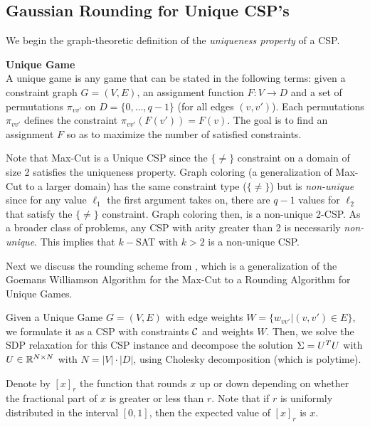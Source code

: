  \subsection{Gaussian Rounding for Unique CSP's}

We begin the graph-theoretic definition of the \textit{uniqueness property} of a CSP.
\begin{definition}{\bf Unique Game}\\
A unique game is any game that can be stated in the following terms: given a constraint graph $G = (V, E)$, an assignment function $F: V \rightarrow D$ and a set of permutations $\pi_{vv'}$ on $D = \{0, \ldots, q-1 \}$ (for all edges $(v, v')$). Each permutations $\pi_{vv'}$ defines the constraint $\pi_{vv'}(F(v'))=F(v)$. The goal is to find an assignment $F$ so as to maximize the number of satisfied constraints.
\end{definition}

Note that Max-Cut is a Unique CSP since the $\{\neq\}$ constraint on a domain of size 2 satisfies the uniqueness property. Graph coloring (a generalization of Max-Cut to a larger domain) has the same constraint type ($\{\neq\}$) but is \textit{non-unique} since for any value $\ell_1$ the first argument takes on, there are $q-1$ values for $\ell_2$ that satisfy the $\{\neq\}$ constraint. Graph coloring then, is a non-unique 2-CSP. As a broader class of problems, any CSP with arity greater than 2 is necessarily \textit{non-unique}. This implies that $k-$SAT with $k > 2$ is a non-unique CSP.

Next we discuss the rounding scheme from \cite{cmm06}, which is a generalization of the Goemans Williamson Algorithm for the Max-Cut to a Rounding Algorithm for Unique Games. 

Given a Unique Game $G = (V,E)$ with edge weights $W = \{w_{vv'} | (v, v') \in E \}$, we formulate it as a CSP with constraints $\mathcal{C}$ and weights $W$. Then, we solve the SDP relaxation for this CSP instance and decompose the solution $\Sigma = U^T U$ with $U \in \mathbb{R}^{N \times N}$ with $N = |V| \cdot |D|$, using Cholesky decomposition (which is polytime). 

Denote by $[x]_r$ the function that rounds $x$ up or down depending on whether the fractional part of $x$ is greater or less than $r$. 
Note that if $r$ is uniformly distributed in the interval $[0,1]$, then the expected value of $[x]_r$ is $x$. 

